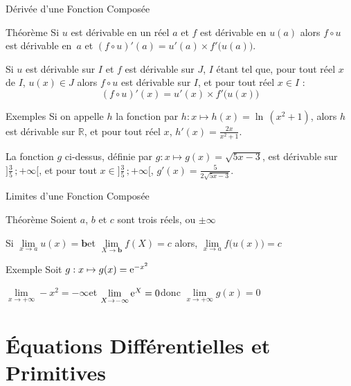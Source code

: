 \documentclass{coursbook}
\begin{document}
    \begin{Gpartie}{Dérivée d'une Fonction Composée} 
        \begin{Spartie}{Théorème} 
            Si $u$ est dérivable en un réel $a$ et $f$ est dérivable en $u(a)$ alors $f\circ u$ est dérivable en~$a$ et $(f\circ u)'(a)=u'(a)\times f'\big(u(a)\big)$.

            Si $u$ est dérivable sur $I$ et $f$ est dérivable sur $J$, $I$ étant tel que, pour tout réel $x$ de $I$, $u(x)\in J$ alors $f\circ u$ est dérivable sur $I$, et pour tout réel $x\in I$ : \[\boxed{(f\circ u)'(x)=u'(x)\times f'\big(u(x)\big)}\] 
        \end{Spartie}
        \begin{Spartie}{Exemples} 
            Si on appelle $h$ la fonction par $h:x\mapsto h(x)=\ln\,(x^2+1)$, alors $h$ est dérivable sur $\mathbb{R}$, et pour tout réel $x$, $h'(x)=\frac{2x}{x^2+1}$.

            La fonction $g$ ci-dessus, définie par $g:x\mapsto g(x)=\sqrt{5x-3}$, est dérivable sur~$\Big]\frac{3}{5}\,;+\infty\Big[$, et pour tout $x\in\Big]\frac{3}{5}\,;+\infty\Big[$, $g'(x)=\frac{5}{2\sqrt{5x-3}}$.
        \end{Spartie}
    \end{Gpartie}
    \begin{Gpartie}{Limites d'une Fonction Composée} 
        \begin{Spartie}{Théorème} 
            Soient $a$, $b$ et $c$ sont trois réels, ou $\pm\infty$

            Si \qquad$\lim\limits_{x\to a}u(x)=\boldsymbol{b}$\qquad et \qquad $\lim\limits_{X\to \boldsymbol{b}}f(X)=c$ \qquad alors, \qquad $\boxed{\lim\limits_{x\to a}f\big(u(x)\big)=c}$
        \end{Spartie}
        \begin{Spartie}{Exemple} 
            Soit $g:x\mapsto g(x)=\mathrm{e}^{-x^2}$

            $\lim\limits_{x\to +\infty} -x^2=-\infty$\qquad et \qquad$\lim\limits_{X\to -\infty} \mathrm{e}^X=0$\qquad donc \qquad$\lim\limits_{x\to +\infty}g(x)=0$
        \end{Spartie}
    \end{Gpartie}





    \chapter{Équations Différentielles et Primitives}
\end{document}
